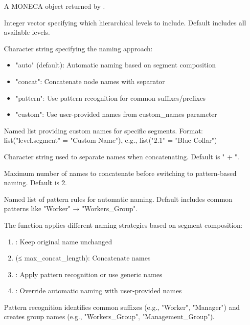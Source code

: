 \documentclass[a4paper]{book}
\begin{document}
\begin{Arguments}
\begin{ldescription}
\item[\code{segments}] A MONECA object returned by .

\item[\code{level}] Integer vector specifying which hierarchical levels to include.
Default includes all available levels.

\item[\code{naming\_strategy}] Character string specifying the naming approach:
\begin{itemize}

\item{} "auto" (default): Automatic naming based on segment composition
\item{} "concat": Concatenate node names with separator
\item{} "pattern": Use pattern recognition for common suffixes/prefixes
\item{} "custom": Use user-provided names from custom\_names parameter

\end{itemize}


\item[\code{custom\_names}] Named list providing custom names for specific segments.
Format: list("level.segment" = "Custom Name"), e.g., list("2.1" = "Blue Collar")

\item[\code{separator}] Character string used to separate names when concatenating.
Default is " + ".

\item[\code{max\_concat\_length}] Maximum number of names to concatenate before 
switching to pattern-based naming. Default is 2.

\item[\code{pattern\_rules}] Named list of pattern rules for automatic naming.
Default includes common patterns like "Worker" → "Workers\_Group".
\end{ldescription}
\end{Arguments}
%
\begin{Details}
The function applies different naming strategies based on segment composition:
\begin{enumerate}

\item{} : Keep original name unchanged
\item{}  (≤ max\_concat\_length): Concatenate names
\item{} : Apply pattern recognition or use generic names
\item{} : Override automatic naming with user-provided names

\end{enumerate}


Pattern recognition identifies common suffixes (e.g., "Worker", "Manager") 
and creates group names (e.g., "Workers\_Group", "Management\_Group").
\end{Details}
\end{document}
